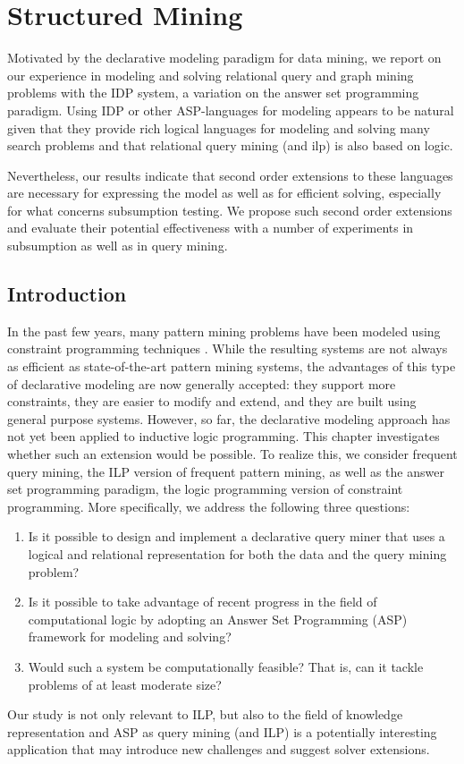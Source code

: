 \chapter{Structured Mining}\label{ch:StructuredMining}
Motivated by the declarative modeling paradigm for data mining, we report on our experience in modeling and solving relational query and graph mining problems with the IDP system, a variation on the answer set programming paradigm. Using IDP or other ASP-languages for modeling appears to be natural given that they provide rich logical languages for modeling and solving many search problems and that relational query mining (and \acrshort{ilp}) is also based on logic.

  Nevertheless, our results indicate that second order extensions to these languages are necessary for expressing the model as well as for efficient solving, especially for what concerns subsumption testing. We propose such second order extensions and evaluate their potential effectiveness with a number of experiments in subsumption as well as in query mining.

\section{Introduction}
\label{sec:intro}
In the past few years, many pattern mining problems have been modeled using constraint programming techniques \parencite{guns_framework}.
While the resulting systems are not always as efficient as state-of-the-art pattern mining systems,
the advantages of this type of declarative modeling are  now generally accepted: they support more constraints,
they are easier to modify and extend, and they are built using general purpose systems.
However, so far, the declarative modeling approach has not yet been applied to inductive logic programming. This chapter investigates whether such 
an extension would be possible.  To realize this, we consider frequent query mining, the ILP version of frequent pattern mining, as well as the answer set programming paradigm, the logic programming version of constraint programming. 
More specifically, we address the following three questions: 

\begin{enumerate}
\item[\qone] Is it possible to design and implement a declarative query miner that uses a logical and relational representation for both the data and the query mining problem? 
\item[\qtwo] Is it possible to take advantage of recent progress in the field of computational logic by adopting an Answer Set Programming (ASP) \parencite{eiter} framework for modeling and solving? 
\item[\qthree] Would such a system be computationally feasible? That is, can it tackle problems of at least moderate size?
\end{enumerate}
Our study is not only relevant to ILP, but also to the field of knowledge representation and ASP
as query mining (and ILP) is a potentially interesting application 
that may introduce new challenges and suggest solver extensions. 

